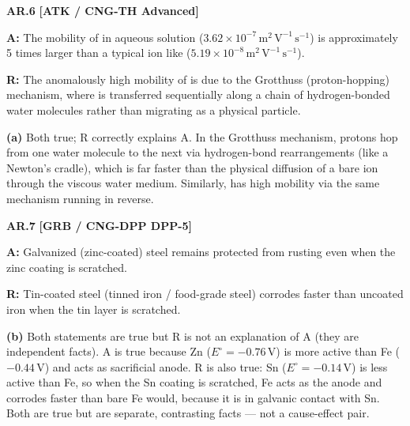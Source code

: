 \begin{problembox}
\textbf{AR.6} \hfill \textbf{[ATK / CNG-TH Advanced]}

\textbf{A:} The mobility of  in aqueous solution ($3.62\times10^{-7}\,\text{m}^2\,\text{V}^{-1}\,\text{s}^{-1}$) is approximately 5 times larger than a typical ion like  ($5.19\times10^{-8}\,\text{m}^2\,\text{V}^{-1}\,\text{s}^{-1}$).

\textbf{R:} The anomalously high mobility of  is due to the Grotthuss (proton-hopping) mechanism, where  is transferred sequentially along a chain of hydrogen-bonded water molecules rather than migrating as a physical particle.
\end{problembox}
\begin{solution}
\textbf{(a)} Both true; R correctly explains A. In the Grotthuss mechanism, protons hop from one water molecule to the next via hydrogen-bond rearrangements (like a Newton's cradle), which is far faster than the physical diffusion of a bare ion through the viscous water medium. Similarly,  has high mobility via the same mechanism running in reverse.
\end{solution}

\begin{problembox}
\textbf{AR.7} \hfill \textbf{[GRB / CNG-DPP DPP-5]}

\textbf{A:} Galvanized (zinc-coated) steel remains protected from rusting even when the zinc coating is scratched.

\textbf{R:} Tin-coated steel (tinned iron / food-grade steel) corrodes faster than uncoated iron when the tin layer is scratched.
\end{problembox}
\begin{solution}
\textbf{(b)} Both statements are true but R is not an explanation of A (they are independent facts). A is true because Zn ($E^\circ = -0.76\,\text{V}$) is more active than Fe ($-0.44\,\text{V}$) and acts as sacrificial anode. R is also true: Sn ($E^\circ = -0.14\,\text{V}$) is less active than Fe, so when the Sn coating is scratched, Fe acts as the anode and corrodes faster than bare Fe would, because it is in galvanic contact with Sn. Both are true but are separate, contrasting facts --- not a cause-effect pair.
\end{solution}
